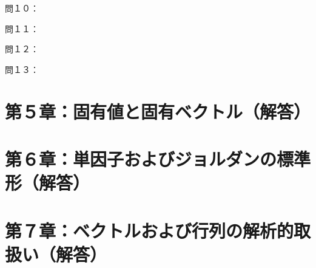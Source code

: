 \documentclass[dvipdfmx,uplatex,11pt]{jsarticle}
\begin{document}
%
%
%
\newpage
%
%
%
\noindent
問１０：




















%
%
%
\newpage
%
%
%
\noindent
問１１：





















%
%
%
\newpage
%
%
%
\noindent
問１２：

















%
%
%
\newpage
%
%
%
問１３：














%
%
%
\newpage
%
%
%
\section{第５章：固有値と固有ベクトル（解答）}
%
%
%
\newpage
%
%
%
\section{第６章：単因子およびジョルダンの標準形（解答）}
%
%
%
\newpage
%
%
%
\section{第７章：ベクトルおよび行列の解析的取扱い（解答）}
\end{document}
